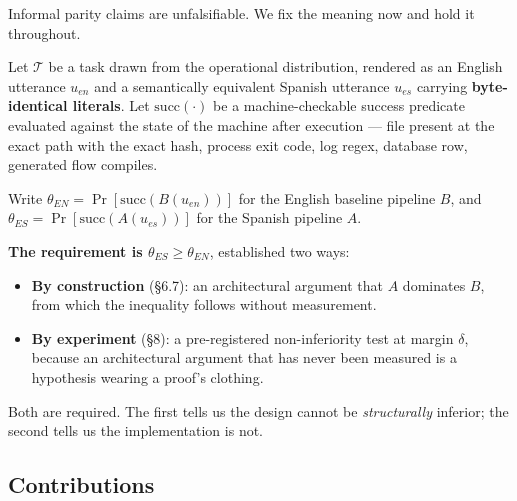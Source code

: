 Informal parity claims are unfalsifiable. We fix the meaning now and hold it throughout.

Let $\mathcal{T}$ be a task drawn from the operational distribution, rendered as an English utterance $u_{en}$ and a semantically equivalent Spanish utterance $u_{es}$ carrying \textbf{byte-identical literals}. Let $\mathrm{succ}(\cdot)$ be a machine-checkable success predicate evaluated against the state of the machine after execution --- file present at the exact path with the exact hash, process exit code, log regex, database row, generated flow compiles.

Write $\theta_{EN} = \Pr[\mathrm{succ}(B(u_{en}))]$ for the English baseline pipeline $B$, and $\theta_{ES} = \Pr[\mathrm{succ}(A(u_{es}))]$ for the Spanish pipeline $A$.

\textbf{The requirement is $\theta_{ES} \ge \theta_{EN}$}, established two ways:

\begin{itemize}
  \item \textbf{By construction} (\S6.7): an architectural argument that $A$ dominates $B$, from which the inequality follows without measurement.
  \item \textbf{By experiment} (\S8): a pre-registered non-inferiority test at margin $\delta$, because an architectural argument that has never been measured is a hypothesis wearing a proof's clothing.
\end{itemize}

Both are required. The first tells us the design cannot be \emph{structurally} inferior; the second tells us the implementation is not.

\subsection{Contributions}
\label{sec:contributions}

